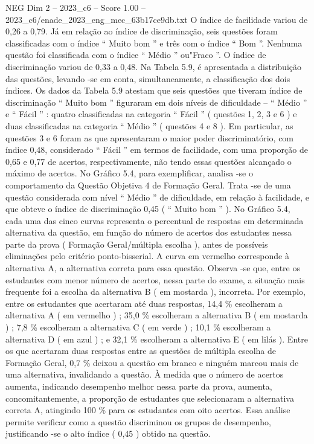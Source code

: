 \begin{textsample}{NEG Dim 2 – 2023\_c6 – Score 1.00 – 2023\_c6/enade\_2023\_eng\_mec\_63b17ce9db.txt}
O índice de facilidade variou de 0,26 a 0,79.
Já em relação ao índice de discriminação, seis questões foram classificadas com o índice “ Muito bom ” e três com o índice “ Bom ”.
Nenhuma questão foi classificada com o índice “ Médio ” ou"Fraco ”.
O índice de discriminação variou de 0,33 a 0,48.
Na Tabela 5.9, é apresentada a distribuição das questões, levando -se em conta, simultaneamente, a classificação dos dois índices.
Os dados da Tabela 5.9 atestam que seis questões que tiveram índice de discriminação “ Muito bom ” figuraram em dois níveis de dificuldade – “ Médio ” e “ Fácil ” : quatro classificadas na categoria “ Fácil ” ( questões 1, 2, 3 e 6 ) e duas classificadas na categoria “ Médio ” ( questões 4 e 8 ).
Em particular, as questões 3 e 6 foram as que apresentaram o maior poder discriminatório, com índice 0,48, considerado “ Fácil ” em termos de facilidade, com uma proporção de 0,65 e 0,77 de acertos, respectivamente, não tendo essas questões alcançado o máximo de acertos.
No Gráfico 5.4, para exemplificar, analisa -se o comportamento da Questão Objetiva 4 de Formação Geral.
Trata -se de uma questão considerada com nível “ Médio ” de dificuldade, em relação à facilidade, e que obteve o índice de discriminação 0,45 ( “ Muito bom ” ).
No Gráfico 5.4, cada uma das cinco curvas representa o percentual de respostas em determinada alternativa da questão, em função do número de acertos dos estudantes nessa parte da prova ( Formação Geral/múltipla escolha ), antes de possíveis eliminações pelo critério ponto-bisserial.
A curva em vermelho corresponde à alternativa A, a alternativa correta para essa questão.
Observa -se que, entre os estudantes com menor número de acertos, nessa parte do exame, a situação mais frequente foi a escolha da alternativa B ( em mostarda ), incorreta.
Por exemplo, entre os estudantes que acertaram até duas respostas, 14,4 \% escolheram a alternativa A ( em vermelho ) ; 35,0 \% escolheram a alternativa B ( em mostarda ) ; 7,8 \% escolheram a alternativa C ( em verde ) ; 10,1 \% escolheram a alternativa D ( em azul ) ; e 32,1 \% escolheram a alternativa E ( em lilás ).
Entre os que acertaram duas respostas entre as questões de múltipla escolha de Formação Geral, 0,7 \% deixou a questão em branco e ninguém marcou mais de uma alternativa, invalidando a questão.
À medida que o número de acertos aumenta, indicando desempenho melhor nessa parte da prova, aumenta, concomitantemente, a proporção de estudantes que selecionaram a alternativa correta A, atingindo 100 \% para os estudantes com oito acertos.
Essa análise permite verificar como a questão discriminou os grupos de desempenho, justificando -se o alto índice ( 0,45 ) obtido na questão.

\end{textsample}

